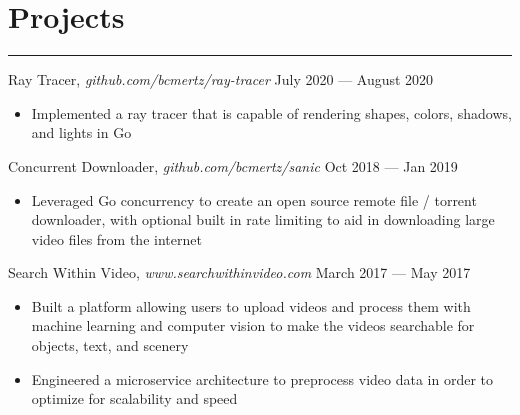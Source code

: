 \documentclass[12pt]{article}
\begin{document}
\vspace{-0.50cm}
\section*{Projects}
\vspace{-0.2cm}
\hrule
\vspace{0.25cm}

\noindent Ray Tracer, \textit{github.com/bcmertz/ray-tracer} \hfill July 2020 --- August 2020
\vspace{-0.1cm}
\begin{itemize}
  \itemsep-0.4em
        \item Implemented a ray tracer that is capable of rendering shapes, colors, shadows, and lights in Go
\end{itemize}

\noindent Concurrent Downloader, \textit{github.com/bcmertz/sanic} \hfill Oct 2018 --- Jan 2019
\vspace{-0.1cm}
\begin{itemize}
  \itemsep-0.4em
        \item Leveraged Go concurrency to create an open source remote file / torrent downloader, with optional built in rate limiting to aid in downloading large video files from the internet
\end{itemize}


\noindent Search Within Video, \textit{www.searchwithinvideo.com} \hfill March 2017 --- May 2017
\vspace{-0.1cm}
\begin{itemize}
  \itemsep-0.4em
        \item Built a platform allowing users to upload videos and process them with machine learning and computer vision to make the videos searchable for objects, text, and scenery
	\item Engineered a microservice architecture to preprocess video data in order to optimize for scalability and speed
\end{itemize}


\end{document}
